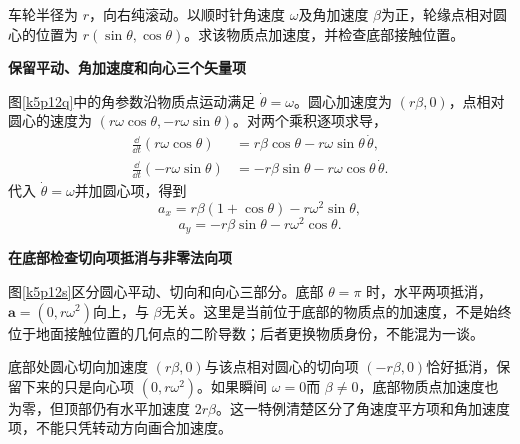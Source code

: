 \begin{question}\begin{example}[变速滚动车轮的加速度]\label{k5p12}
车轮半径为 $r$，向右纯滚动。以顺时针角速度 $\omega$及角加速度 $\beta$为正，轮缘点相对圆心的位置为 $r(\sin\theta,\cos\theta)$。求该物质点加速度，并检查底部接触位置。\end{example}
\end{question}
\begin{solution}\textbf{保留平动、角加速度和向心三个矢量项}\par\nobreak
图\ref{k5p12q}中的角参数沿物质点运动满足 $\dot\theta=\omega$。圆心加速度为 $(r\beta,0)$，点相对圆心的速度为 $(r\omega\cos\theta,-r\omega\sin\theta)$。对两个乘积逐项求导，
\begin{align*}
 \frac{\dd}{\dd t}(r\omega\cos\theta)&=r\beta\cos\theta-r\omega\sin\theta\,\dot\theta,\\
 \frac{\dd}{\dd t}(-r\omega\sin\theta)&=-r\beta\sin\theta-r\omega\cos\theta\,\dot\theta.
\end{align*}
代入 $\dot\theta=\omega$并加圆心项，得到
\[\boxed{a_x=r\beta(1+\cos\theta)-r\omega^2\sin\theta},\]
\[\boxed{a_y=-r\beta\sin\theta-r\omega^2\cos\theta}.\]



\par\medskip{}\noindent\textbf{在底部检查切向项抵消与非零法向项}\par\nobreak
图\ref{k5p12s}区分圆心平动、切向和向心三部分。底部 $\theta=\pi$ 时，水平两项抵消，$\bm a=(0,r\omega^2)$向上，与 $\beta$无关。这里是当前位于底部的物质点的加速度，不是始终位于地面接触位置的几何点的二阶导数；后者更换物质身份，不能混为一谈。

底部处圆心切向加速度 $(r\beta,0)$与该点相对圆心的切向项 $(-r\beta,0)$恰好抵消，保留下来的只是向心项 $(0,r\omega^2)$。如果瞬间 $\omega=0$而 $\beta\ne0$，底部物质点加速度也为零，但顶部仍有水平加速度 $2r\beta$。这一特例清楚区分了角速度平方项和角加速度项，不能只凭转动方向画合加速度。\end{solution}

